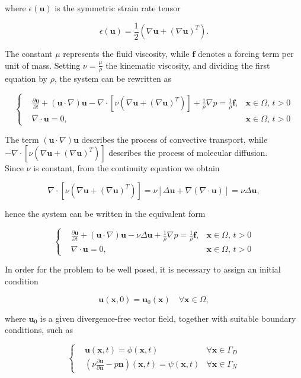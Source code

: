 \documentclass[11pt,a4paper,titlepage]{report}
\begin{document}
where $\epsilon(\mathbf{u})$ is the symmetric strain rate tensor

\[
\epsilon(\mathbf{u}) = \frac{1}{2} (\nabla \mathbf{u} + (\nabla \mathbf{u})^T).
\]

The constant $\mu$ represents the fluid viscosity, while $\mathbf{f}$ denotes a forcing term per unit of mass. Setting $\nu = \frac{\mu}{\rho}$ the kinematic viscosity, and dividing the first equation by $\rho$, the system can be rewritten as

\[
\left\{
\begin{aligned}
&\frac{\partial \mathbf{u}}{\partial t} + ( \mathbf{u} \cdot \nabla) \mathbf{u} - \nabla \cdot [ \nu (\nabla \mathbf{u} + (\nabla  \mathbf{u})^T)] + \frac{1}{\rho} \nabla p = \frac{1}{\rho} \mathbf{f},  & \mathbf{x} \in \Omega, \, t>0 \\
& \nabla \cdot \mathbf{u} = 0, & \mathbf{x} \in \Omega, \, t>0
\end{aligned}
\right.
\]

The term $(\mathbf{u} \cdot \nabla)\mathbf{u}$ describes the process of convective transport, while $- \nabla \cdot [ \nu (\nabla \mathbf{u} + (\nabla  \mathbf{u})^T)] $ describes the process of molecular diffusion.\\
Since $\nu$ is constant, from the continuity equation we obtain

\[
\nabla \cdot [ \nu (\nabla \mathbf{u} + (\nabla  \mathbf{u})^T)] = \nu [\Delta \mathbf{u} + \nabla(\nabla \cdot \mathbf{u})] = \nu \Delta \mathbf{u},
\]

hence the system can be written in the equivalent form

\[
\left\{
\begin{aligned}
&\frac{\partial \mathbf{u}}{\partial t} + ( \mathbf{u} \cdot \nabla) \mathbf{u} - \nu \Delta \mathbf{u} + \frac{1}{\rho} \nabla p = \frac{1}{\rho} \mathbf{f},  & \mathbf{x} \in \Omega, \, t>0 \\
& \nabla \cdot \mathbf{u} = 0, & \mathbf{x} \in \Omega, \, t>0
\end{aligned}
\right.
\]

In order for the problem to be well posed, it is necessary to assign an initial condition

\[
\mathbf{u} (\mathbf{x}, 0) = \mathbf{u}_0(\mathbf{x}) \quad \forall \mathbf{x} \in \Omega,
\]

where $\mathbf{u}_0$ is a given divergence-free vector field, together with suitable boundary conditions, such as

\[
\left\{
\begin{aligned}
& \mathbf{u}(\mathbf{x},t) = \phi (\mathbf{x}, t) & \forall \mathbf{x} \in \Gamma_D \\
& \left( \nu \frac{\partial \mathbf{u}}{\partial \mathbf{n}} - p\mathbf{n} \right) (\mathbf{x},t) = \psi(\mathbf{x},t) & \forall \mathbf{x} \in \Gamma_N
\end{aligned}
\right.
\]
\end{document}
